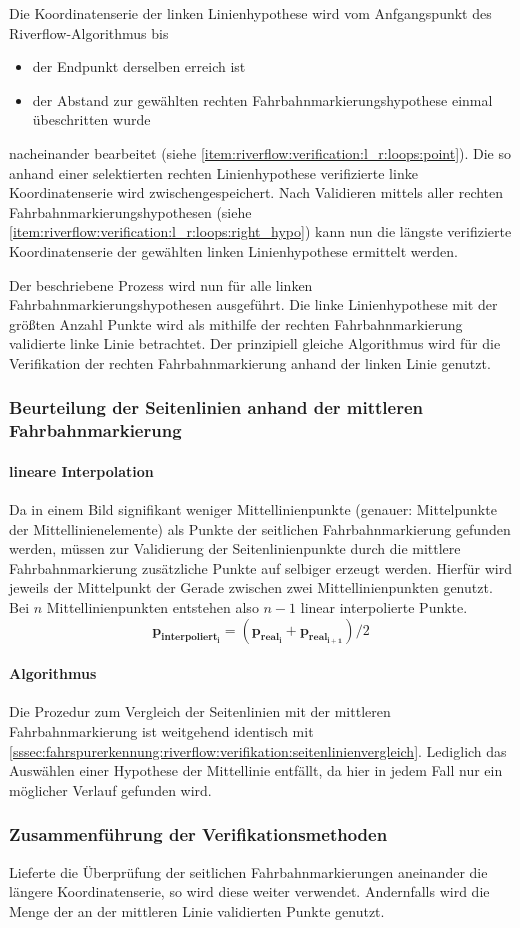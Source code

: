 Die Koordinatenserie der linken Linienhypothese wird vom Anfgangspunkt des Riverflow-Algorithmus bis
\begin{itemize}
\item der Endpunkt derselben erreich ist 
\item der Abstand zur gewählten rechten Fahrbahnmarkierungshypothese einmal übeschritten wurde
\end{itemize}
nacheinander bearbeitet (siehe \ref{item:riverflow:verification:l_r:loops:point}). Die so anhand einer selektierten rechten Linienhypothese verifizierte linke Koordinatenserie wird zwischengespeichert. 
Nach Validieren mittels aller rechten Fahrbahnmarkierungshypothesen (siehe \ref{item:riverflow:verification:l_r:loops:right_hypo}) kann nun die längste verifizierte Koordinatenserie der gewählten linken Linienhypothese ermittelt werden.

Der beschriebene Prozess wird nun für alle linken Fahrbahnmarkierungshypothesen ausgeführt. Die linke Linienhypothese mit der größten Anzahl Punkte wird als mithilfe der rechten Fahrbahnmarkierung validierte linke Linie betrachtet. Der prinzipiell gleiche Algorithmus wird für die Verifikation der rechten Fahrbahnmarkierung anhand der linken Linie genutzt.

\subsubsection{Beurteilung der Seitenlinien anhand der mittleren Fahrbahnmarkierung}
\paragraph{lineare Interpolation}
Da in einem Bild signifikant weniger Mittellinienpunkte (genauer: Mittelpunkte der Mittellinienelemente) als Punkte der seitlichen Fahrbahnmarkierung gefunden werden, müssen zur Validierung der Seitenlinienpunkte durch die mittlere Fahrbahnmarkierung zusätzliche Punkte auf selbiger erzeugt werden. Hierfür wird jeweils der Mittelpunkt der Gerade zwischen zwei Mittellinienpunkten genutzt. Bei \( n \) Mittellinienpunkten entstehen also \( n-1 \) linear interpolierte Punkte.
\begin{equation}
\boldsymbol{p_{interpoliert_i}} = (\boldsymbol{p_{real_i}}+\boldsymbol{p_{real_{i+1}}})/2 
\end{equation}
\paragraph{Algorithmus} Die Prozedur zum Vergleich der Seitenlinien mit der mittleren Fahrbahnmarkierung ist weitgehend identisch mit \ref{sssec:fahrspurerkennung:riverflow:verifikation:seitenlinienvergleich}. Lediglich das Auswählen einer Hypothese der Mittellinie entfällt, da hier in jedem Fall nur ein möglicher Verlauf gefunden wird.

\subsubsection{Zusammenführung der Verifikationsmethoden}
Lieferte die Überprüfung der seitlichen Fahrbahnmarkierungen aneinander die längere Koordinatenserie, so wird diese weiter verwendet. Andernfalls wird die Menge der an der mittleren Linie validierten Punkte genutzt.